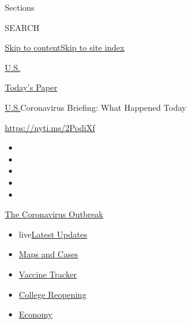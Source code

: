 Sections

SEARCH

\protect\hyperlink{site-content}{Skip to
content}\protect\hyperlink{site-index}{Skip to site index}

\href{https://www.nytimes3xbfgragh.onion/section/us}{U.S.}

\href{https://myaccount.nytimes3xbfgragh.onion/auth/login?response_type=cookie\&client_id=vi}{}

\href{https://www.nytimes3xbfgragh.onion/section/todayspaper}{Today's
Paper}

\href{/section/us}{U.S.}\textbar{}Coronavirus Briefing: What Happened
Today

\url{https://nyti.ms/2PodiXf}

\begin{itemize}
\item
\item
\item
\item
\item
\end{itemize}

\href{https://www.nytimes3xbfgragh.onion/news-event/coronavirus?action=click\&pgtype=Article\&state=default\&region=TOP_BANNER\&context=storylines_menu}{The
Coronavirus Outbreak}

\begin{itemize}
\tightlist
\item
  live\href{https://www.nytimes3xbfgragh.onion/2020/08/04/world/coronavirus-cases.html?action=click\&pgtype=Article\&state=default\&region=TOP_BANNER\&context=storylines_menu}{Latest
  Updates}
\item
  \href{https://www.nytimes3xbfgragh.onion/interactive/2020/us/coronavirus-us-cases.html?action=click\&pgtype=Article\&state=default\&region=TOP_BANNER\&context=storylines_menu}{Maps
  and Cases}
\item
  \href{https://www.nytimes3xbfgragh.onion/interactive/2020/science/coronavirus-vaccine-tracker.html?action=click\&pgtype=Article\&state=default\&region=TOP_BANNER\&context=storylines_menu}{Vaccine
  Tracker}
\item
  \href{https://www.nytimes3xbfgragh.onion/2020/08/02/us/covid-college-reopening.html?action=click\&pgtype=Article\&state=default\&region=TOP_BANNER\&context=storylines_menu}{College
  Reopening}
\item
  \href{https://www.nytimes3xbfgragh.onion/live/2020/08/04/business/stock-market-today-coronavirus?action=click\&pgtype=Article\&state=default\&region=TOP_BANNER\&context=storylines_menu}{Economy}
\end{itemize}

